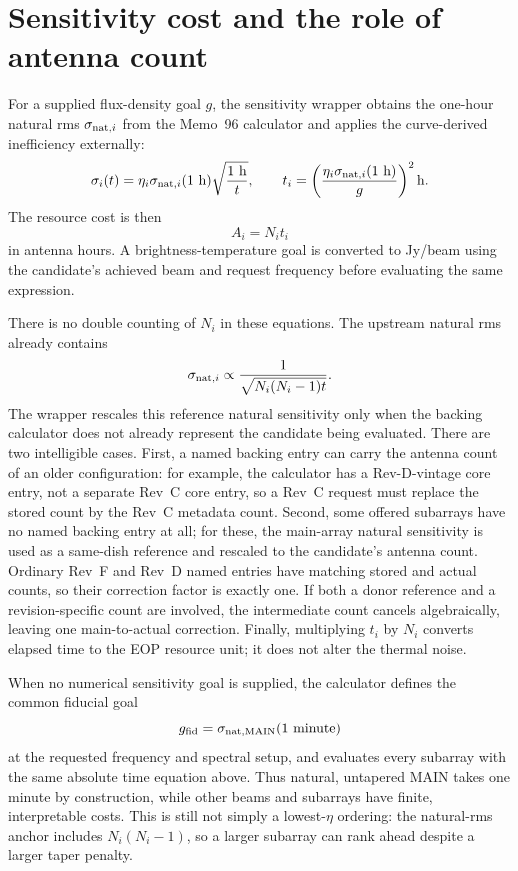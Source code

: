\documentclass[11pt]{article}
\begin{document}
\section{Sensitivity cost and the role of antenna count}

For a supplied flux-density goal $g$, the sensitivity wrapper obtains the
one-hour natural rms $\sigma_{{\rm nat},i}$ from the Memo~96 calculator and
applies the curve-derived inefficiency externally:
\begin{equation}
 \sigma_i(t)=\eta_i\sigma_{{\rm nat},i}(1~{\rm h})
             \sqrt{\frac{1~{\rm h}}{t}},
 \qquad
 t_i=\left(\frac{\eta_i\sigma_{{\rm nat},i}(1~{\rm h})}{g}\right)^2{\rm h}.
\end{equation}
The resource cost is then
\begin{equation}
 A_i=N_i t_i
\end{equation}
in antenna hours.  A brightness-temperature goal is converted to Jy/beam
using the candidate's achieved beam and request frequency before evaluating
the same expression.

There is no double counting of $N_i$ in these equations.  The upstream natural
rms already contains
\begin{equation}
 \sigma_{{\rm nat},i}\mathrel{\propto}
 \frac{1}{\sqrt{N_i(N_i-1)t}}.
\end{equation}
The wrapper rescales this reference natural sensitivity only when the backing
calculator does not already represent the candidate being evaluated.  There
are two intelligible cases.  First, a named backing entry can carry the antenna
count of an older configuration: for example, the calculator has a
Rev-D-vintage core entry, not a separate Rev~C core entry, so a Rev~C request
must replace the stored count by the Rev~C metadata count.  Second, some
offered subarrays have no named backing entry at all; for these, the
main-array natural sensitivity is used as a same-dish reference and rescaled
to the candidate's antenna count.  Ordinary Rev~F and Rev~D named entries have
matching stored and actual counts, so their correction factor is exactly one.
If both a donor reference and a revision-specific count are involved, the
intermediate count cancels algebraically, leaving one main-to-actual
correction.  Finally, multiplying $t_i$ by $N_i$ converts elapsed time to the
EOP resource unit; it does not alter the thermal noise.

When no numerical sensitivity goal is supplied, the calculator defines the
common fiducial goal
\begin{equation}
 g_{\rm fid}=\sigma_{{\rm nat},\mathrm{MAIN}}(1~{\rm minute})
\end{equation}
at the requested frequency and spectral setup, and evaluates every subarray
with the same absolute time equation above.  Thus natural, untapered MAIN
takes one minute by construction, while other beams and subarrays have finite,
interpretable costs.  This is still not simply a lowest-$\eta$ ordering: the
natural-rms anchor includes $N_i(N_i-1)$, so a larger subarray can rank ahead
despite a larger taper penalty.
\end{document}
